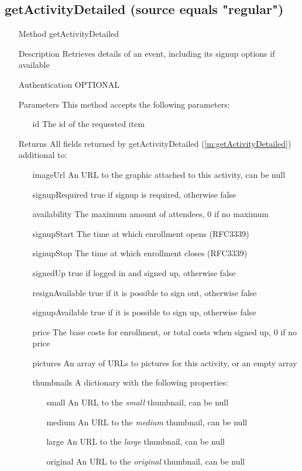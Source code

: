 \documentclass[a4paper]{scrreprt}
\begin{document}
\subsection{getActivityDetailed (source equals "regular")}\label{m:getActivityDetailedRegular}
\begin{enumerate}
\item[Method] getActivityDetailed
\item[Description] Retrieves details of an event, including its signup options if available
\item[Authentication] OPTIONAL
\item[Parameters] This method accepts the following parameters:
\begin{enumerate}
    \item[id] The id of the requested item
    \end{enumerate}
\item[Returns] All fields returned by getActivityDetailed (\autoref{m:getActivityDetailed}) additional to:
\begin{enumerate}
    \item[imageUrl] An URL to the graphic attached to this activity, can be null
    \item[signupRequired] true if signup is required, otherwise false
    \item[availability] The maximum amount of attendees, 0 if no maximum
    \item[signupStart] The time at which enrollment opens (RFC3339)
    \item[signupStop] The time at which enrollment closes (RFC3339)
    \item[signedUp] true if logged in and signed up, otherwise false
    \item[resignAvailable] true if it is possible to sign out, otherwise false
    \item[signupAvailable] true if it is possible to sign up, otherwise false
    \item[price] The base costs for enrollment, or total costs when signed up, 0 if no price
    \item[pictures] An array of URLs to pictures for this activity, or an empty array
    \item[thumbnails] A dictionary with the following properties:
    \begin{enumerate}
        \item[small] An URL to the \textit{small} thumbnail, can be null
        \item[medium] An URL to the \textit{medium} thumbnail, can be null
        \item[large] An URL to the \textit{large} thumbnail, can be null
        \item[original] An URL to the \textit{original} thumbnail, can be null
        \end{enumerate}


\end{enumerate}
\end{enumerate}
\end{document}
